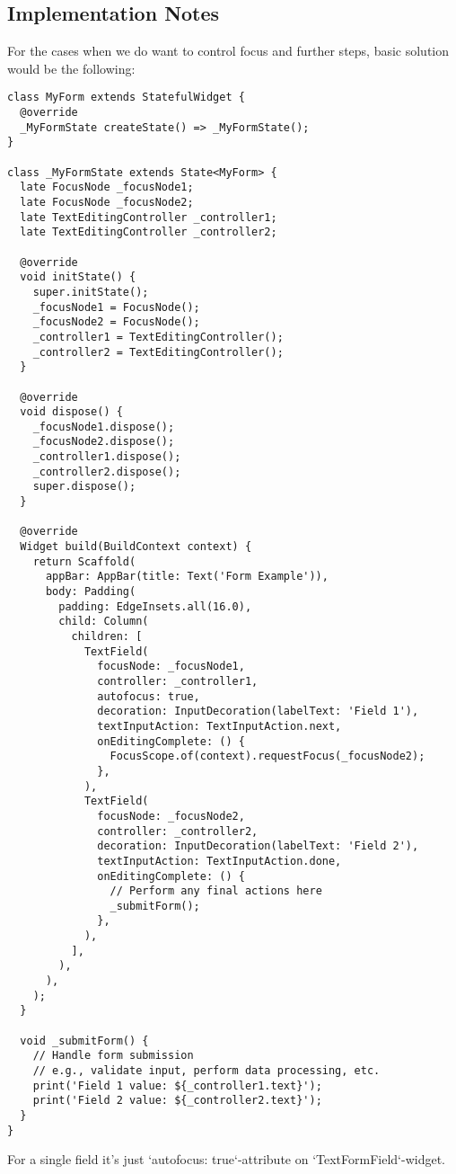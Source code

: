 \subsection{Implementation Notes}

For the cases when we do want to control focus and further steps, basic solution would be the following:

\begin{lstlisting}
class MyForm extends StatefulWidget {
  @override
  _MyFormState createState() => _MyFormState();
}

class _MyFormState extends State<MyForm> {
  late FocusNode _focusNode1;
  late FocusNode _focusNode2;
  late TextEditingController _controller1;
  late TextEditingController _controller2;

  @override
  void initState() {
    super.initState();
    _focusNode1 = FocusNode();
    _focusNode2 = FocusNode();
    _controller1 = TextEditingController();
    _controller2 = TextEditingController();
  }

  @override
  void dispose() {
    _focusNode1.dispose();
    _focusNode2.dispose();
    _controller1.dispose();
    _controller2.dispose();
    super.dispose();
  }

  @override
  Widget build(BuildContext context) {
    return Scaffold(
      appBar: AppBar(title: Text('Form Example')),
      body: Padding(
        padding: EdgeInsets.all(16.0),
        child: Column(
          children: [
            TextField(
              focusNode: _focusNode1,
              controller: _controller1,
              autofocus: true,
              decoration: InputDecoration(labelText: 'Field 1'),
              textInputAction: TextInputAction.next,
              onEditingComplete: () {
                FocusScope.of(context).requestFocus(_focusNode2);
              },
            ),
            TextField(
              focusNode: _focusNode2,
              controller: _controller2,
              decoration: InputDecoration(labelText: 'Field 2'),
              textInputAction: TextInputAction.done,
              onEditingComplete: () {
                // Perform any final actions here
                _submitForm();
              },
            ),
          ],
        ),
      ),
    );
  }

  void _submitForm() {
    // Handle form submission
    // e.g., validate input, perform data processing, etc.
    print('Field 1 value: ${_controller1.text}');
    print('Field 2 value: ${_controller2.text}');
  }
}
\end{lstlisting}

For a single field it's just `autofocus: true`-attribute on `TextFormField`-widget.
